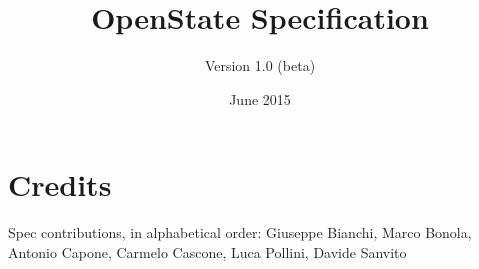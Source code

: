 \documentclass[a4paper,11pt,twoside=semi]{scrreprt}
\title{OpenState Specification}
\subtitle{Version 1.0 (beta)}
\author{}
\date{June 2015}
\begin{document}
\maketitle


\tableofcontents

\newpage
\clearpage










\section*{Credits}
Spec contributions, in alphabetical order: Giuseppe Bianchi, Marco Bonola, Antonio Capone, Carmelo Cascone, Luca Pollini, Davide Sanvito
\end{document}
